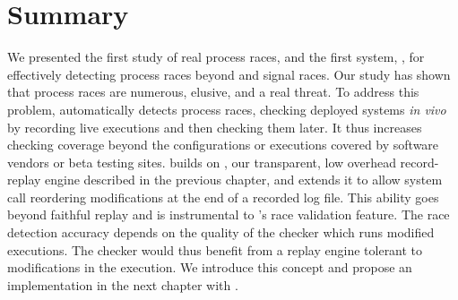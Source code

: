 \section{Summary} \label{racepro:sec:conclusion}

We presented the first study of real process races, and the first
system, \racepro, for effectively detecting process races beyond \toctou
and signal races.   Our study has shown that process races are
numerous, elusive, and a real threat.  To address this problem, \racepro
automatically detects process races, checking deployed
systems \emph{in vivo} by recording live executions and then checking
them later.  It thus increases checking coverage beyond the
configurations or executions covered by software vendors or beta
testing sites. \racepro builds on \scribe, our transparent, low overhead
record-replay engine described in the previous chapter, and extends it
to allow system call reordering modifications at the end of a recorded log file.
This ability goes beyond faithful replay and is instrumental to
\racepro's race validation feature.
The race detection accuracy depends on the quality of the checker which runs
modified executions. The checker would thus benefit from a replay engine
tolerant to modifications in the execution. We introduce this concept and
propose an implementation in the next chapter with \dora.
